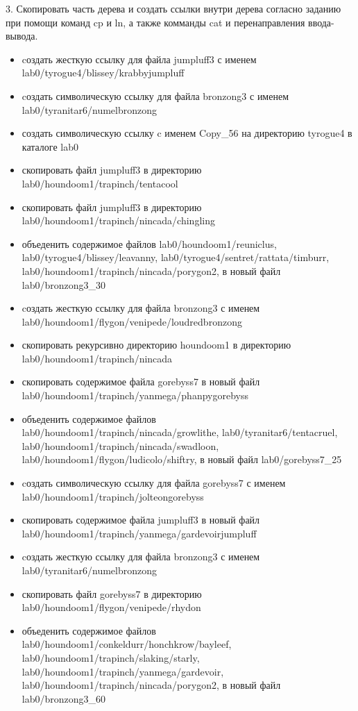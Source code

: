 \documentclass{article}
\begin{document}

3. Скопировать часть дерева и создать ссылки внутри дерева согласно заданию при помощи команд cp и ln, а также комманды cat и перенаправления ввода-вывода.

\begin{itemize}
  \item cоздать жесткую ссылку для файла jumpluff3 с именем lab0/tyrogue4/blissey/krabbyjumpluff
  \item cоздать символическую ссылку для файла bronzong3 с именем lab0/tyranitar6/numelbronzong
  \item создать символическую ссылку c именем Copy\_56 на директорию tyrogue4 в каталоге lab0
  \item скопировать файл jumpluff3 в директорию lab0/houndoom1/trapinch/tentacool
  \item скопировать файл jumpluff3 в директорию lab0/houndoom1/trapinch/nincada/chingling
  \item объеденить содержимое файлов lab0/houndoom1/reuniclus, lab0/tyrogue4/blissey/leavanny, lab0/tyrogue4/sentret/rattata/timburr, lab0/houndoom1/trapinch/nincada/porygon2, в новый файл lab0/bronzong3\_30
  \item cоздать жесткую ссылку для файла bronzong3 с именем lab0/houndoom1/flygon/venipede/loudredbronzong
  \item скопировать рекурсивно директорию houndoom1 в директорию lab0/houndoom1/trapinch/nincada
  \item скопировать содержимое файла gorebyss7 в новый файл lab0/houndoom1/trapinch/yanmega/phanpygorebyss
  \item объеденить содержимое файлов lab0/houndoom1/trapinch/nincada/growlithe, lab0/tyranitar6/tentacruel, lab0/houndoom1/trapinch/nincada/swadloon, lab0/houndoom1/flygon/ludicolo/shiftry, в новый файл lab0/gorebyss7\_25
  \item cоздать символическую ссылку для файла gorebyss7 с именем lab0/houndoom1/trapinch/jolteongorebyss
  \item скопировать содержимое файла jumpluff3 в новый файл lab0/houndoom1/trapinch/yanmega/gardevoirjumpluff
  \item cоздать жесткую ссылку для файла bronzong3 с именем lab0/tyranitar6/numelbronzong
  \item скопировать файл gorebyss7 в директорию lab0/houndoom1/flygon/venipede/rhydon
  \item объеденить содержимое файлов lab0/houndoom1/conkeldurr/honchkrow/bayleef, lab0/houndoom1/trapinch/slaking/starly, lab0/houndoom1/trapinch/yanmega/gardevoir, lab0/houndoom1/trapinch/nincada/porygon2, в новый файл lab0/bronzong3\_60

\end{itemize}
\end{document}
